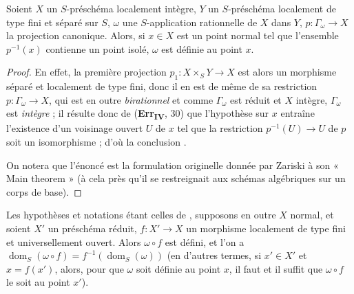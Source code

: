 \begin{proposition}[20.4.4]
\label{IV.20.4.4}
Soient $X$ un $S$-préschéma localement intègre, $Y$ un $S$-préschéma localement de type fini et séparé sur $S$, $\omega$ une $S$-application rationnelle de $X$ dans $Y$, $p:\Gamma_\omega\to X$ la projection canonique.
Alors, si $x\in X$ est un point normal tel que l'ensemble $p^{-1}(x)$ contienne un point isolé, $\omega$ est définie au point $x$.
\end{proposition}

\begin{proof}
En effet, la première projection $p_1:X\times_S Y\to X$ est alors un morphisme séparé et localement de type fini, donc il en est de même de sa restriction $p:\Gamma_\omega\to X$, qui est en outre \emph{birationnel} et comme $\Gamma_\omega$ est réduit et $X$ intègre, $\Gamma_\omega$ est \emph{intègre} ; il résulte donc de (\textbf{Err}\textsubscript{\textbf{IV}}, 30) que l'hypothèse sur $x$ entraîne l'existence d'un voisinage ouvert $U$ de $x$ tel que la restriction $p^{-1}(U)\to U$ de $p$ soit un isomorphisme ; d'où la conclusion .

On notera que l'énoncé  est la formulation originelle donnée par Zariski à son « Main theorem » (à cela près qu'il se restreignait aux schémas algébriques sur un corps de base).
\end{proof}

\begin{proposition}[20.4.5]
\label{IV.20.4.5}
Les hypothèses et notations étant celles de , supposons en outre $X$ normal, et soient $X'$ un préschéma réduit, $f:X'\to X$ un morphisme localement de type fini et universellement ouvert.
Alors $\omega\circ f$ est défini, et l'on a $\operatorname{dom}_S(\omega\circ f)=f^{-1}(\operatorname{dom}_S(\omega))$ (en d'autres termes, si $x'\in X'$ et $x=f(x')$, alors, pour que $\omega$ soit définie au point $x$, il faut et il suffit que $\omega\circ f$ le soit au point $x'$).
\end{proposition}

